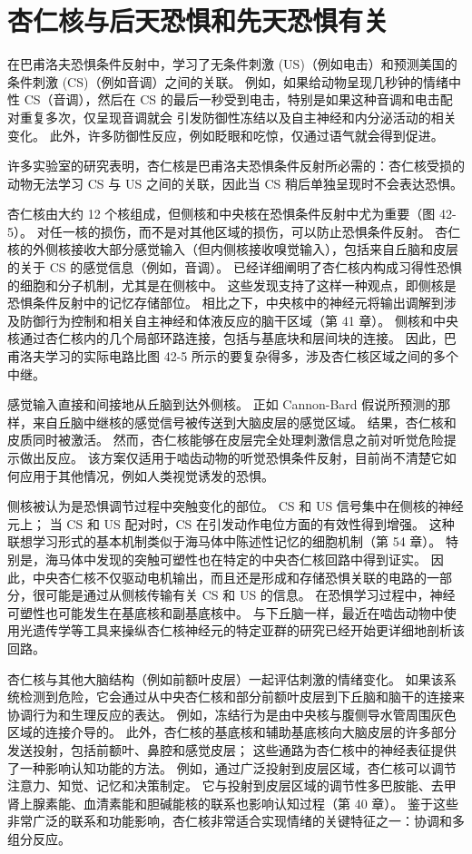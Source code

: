 \section{杏仁核与后天恐惧和先天恐惧有关}
在巴甫洛夫恐惧条件反射中，学习了无条件刺激 (US)（例如电击）和预测美国的条件刺激 (CS)（例如音调）之间的关联。 例如，如果给动物呈现几秒钟的情绪中性 CS（音调），然后在 CS 的最后一秒受到电击，特别是如果这种音调和电击配对重复多次，仅呈现音调就会 引发防御性冻结以及自主神经和内分泌活动的相关变化。 此外，许多防御性反应，例如眨眼和吃惊，仅通过语气就会得到促进。

许多实验室的研究表明，杏仁核是巴甫洛夫恐惧条件反射所必需的：杏仁核受损的动物无法学习 CS 与 US 之间的关联，因此当 CS 稍后单独呈现时不会表达恐惧。

杏仁核由大约 12 个核组成，但侧核和中央核在恐惧条件反射中尤为重要（图 42-5）。 对任一核的损伤，而不是对其他区域的损伤，可以防止恐惧条件反射。 杏仁核的外侧核接收大部分感觉输入（但内侧核接收嗅觉输入），包括来自丘脑和皮层的关于 CS 的感觉信息（例如，音调）。 已经详细阐明了杏仁核内构成习得性恐惧的细胞和分子机制，尤其是在侧核中。 这些发现支持了这样一种观点，即侧核是恐惧条件反射中的记忆存储部位。 相比之下，中央核中的神经元将输出调解到涉及防御行为控制和相关自主神经和体液反应的脑干区域（第 41 章）。 侧核和中央核通过杏仁核内的几个局部环路连接，包括与基底块和层间块的连接。 因此，巴甫洛夫学习的实际电路比图 42-5 所示的要复杂得多，涉及杏仁核区域之间的多个中继。

感觉输入直接和间接地从丘脑到达外侧核。 正如 Cannon-Bard 假说所预测的那样，来自丘脑中继核的感觉信号被传送到大脑皮层的感觉区域。 结果，杏仁核和皮质同时被激活。 然而，杏仁核能够在皮层完全处理刺激信息之前对听觉危险提示做出反应。 该方案仅适用于啮齿动物的听觉恐惧条件反射，目前尚不清楚它如何应用于其他情况，例如人类视觉诱发的恐惧。

侧核被认为是恐惧调节过程中突触变化的部位。 CS 和 US 信号集中在侧核的神经元上； 当 CS 和 US 配对时，CS 在引发动作电位方面的有效性得到增强。 这种联想学习形式的基本机制类似于海马体中陈述性记忆的细胞机制（第 54 章）。 特别是，海马体中发现的突触可塑性也在特定的中央杏仁核回路中得到证实。 因此，中央杏仁核不仅驱动电机输出，而且还是形成和存储恐惧关联的电路的一部分，很可能是通过从侧核传输有关 CS 和 US 的信息。 在恐惧学习过程中，神经可塑性也可能发生在基底核和副基底核中。 与下丘脑一样，最近在啮齿动物中使用光遗传学等工具来操纵杏仁核神经元的特定亚群的研究已经开始更详细地剖析该回路。

杏仁核与其他大脑结构（例如前额叶皮层）一起评估刺激的情绪变化。 如果该系统检测到危险，它会通过从中央杏仁核和部分前额叶皮层到下丘脑和脑干的连接来协调行为和生理反应的表达。 例如，冻结行为是由中央核与腹侧导水管周围灰色区域的连接介导的。 此外，杏仁核的基底核和辅助基底核向大脑皮层的许多部分发送投射，包括前额叶、鼻腔和感觉皮层； 这些通路为杏仁核中的神经表征提供了一种影响认知功能的方法。 例如，通过广泛投射到皮层区域，杏仁核可以调节注意力、知觉、记忆和决策制定。 它与投射到皮层区域的调节性多巴胺能、去甲肾上腺素能、血清素能和胆碱能核的联系也影响认知过程（第 40 章）。 鉴于这些非常广泛的联系和功能影响，杏仁核非常适合实现情绪的关键特征之一：协调和多组分反应。

